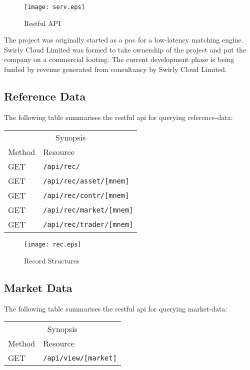 \documentclass[11pt,a4paper]{article}
\newcommand{\scltd}{Swirly Cloud Limited\cite{swirlycloud:www}}
\begin{document}
\begin{figure}[H]
\centering
\texttt{[image: serv.eps]}
\caption{Restful API}
\end{figure}

The project was originally started as a \gls{poc} for a low-latency \gls{matching engine}. \scltd{}
was formed to take ownership of the project and put the company on a commercial footing. The current
development phase is being funded by revenue generated from consultancy by \scltd{}.

\subsection{Reference Data}

The following table summarises the \gls{restful} \gls{api} for querying reference-data:

\vspace{5mm}
\begin{tabular}{ll}
\multicolumn{2}{c}{Synopsis}\\
Method&Resource\\
\hline
GET&\texttt{/api/rec/}\\
GET&\texttt{/api/rec/asset/[mnem]}\\
GET&\texttt{/api/rec/contr/[mnem]}\\
GET&\texttt{/api/rec/market/[mnem]}\\
GET&\texttt{/api/rec/trader/[mnem]}\\
\end{tabular}
\vspace{5mm}

\begin{figure}[H]
\centering
\texttt{[image: rec.eps]}
\caption{Record Structures}
\end{figure}

\subsection{Market Data}

The following table summarises the \gls{restful} \gls{api} for querying \gls{market}-data:

\vspace{5mm}
\begin{tabular}{ll}
\multicolumn{2}{c}{Synopsis}\\
Method&Resource\\
\hline
GET&\texttt{/api/view/[market]}\\
\end{tabular}
\vspace{5mm}
\end{document}
